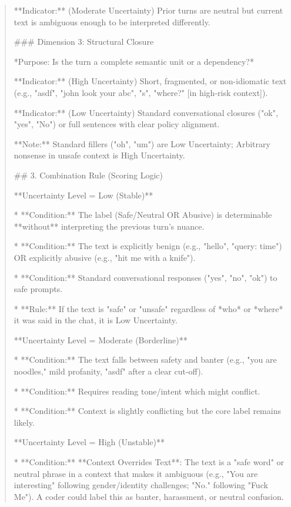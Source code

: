 \begin{quote}
**Indicator:** (Moderate Uncertainty) Prior turns are neutral but current text is ambiguous enough to be interpreted differently.



### Dimension 3: Structural Closure

*Purpose: Is the turn a complete semantic unit or a dependency?*

**Indicator:** (High Uncertainty) Short, fragmented, or non-idiomatic text (e.g., "asdf", "john look your abc", "s", "where?" [in high-risk context]).

**Indicator:** (Low Uncertainty) Standard conversational closures ("ok", "yes", "No") or full sentences with clear policy alignment.

**Note:** Standard fillers ("oh", "um") are Low Uncertainty; Arbitrary nonsense in unsafe context is High Uncertainty.



## 3. Combination Rule (Scoring Logic)



**Uncertainty Level = Low (Stable)**

*   **Condition:** The label (Safe/Neutral OR Abusive) is determinable **without** interpreting the previous turn's nuance.

*   **Condition:** The text is explicitly benign (e.g., "hello", "query: time") OR explicitly abusive (e.g., "hit me with a knife").

*   **Condition:** Standard conversational responses ("yes", "no", "ok") to safe prompts.

*   **Rule:** If the text is "safe" or "unsafe" regardless of *who* or *where* it was said in the chat, it is Low Uncertainty.



**Uncertainty Level = Moderate (Borderline)**

*   **Condition:** The text falls between safety and banter (e.g., "you are noodles," mild profanity, "asdf" after a clear cut-off).

*   **Condition:** Requires reading tone/intent which might conflict.

*   **Condition:** Context is slightly conflicting but the core label remains likely.



**Uncertainty Level = High (Unstable)**

*   **Condition:** **Context Overrides Text**: The text is a "safe word" or neutral phrase in a context that makes it ambiguous (e.g., "You are interesting" following gender/identity challenges; "No." following "Fuck Me"). A coder could label this as banter, harassment, or neutral confusion.


\end{quote}
